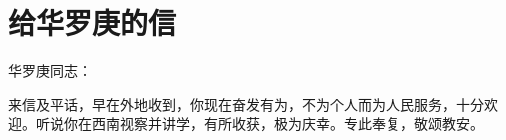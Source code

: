\section[给华罗庚的信（一九六五年七月二十一日）]{给华罗庚的信}


华罗庚同志：

来信及平话，早在外地收到，你现在奋发有为，不为个人而为人民服务，十分欢迎。听说你在西南视察并讲学，有所收获，极为庆幸。专此奉复，敬颂教安。



